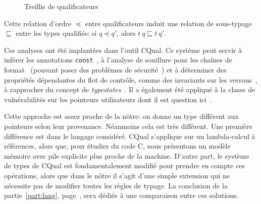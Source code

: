 \begin{figure}[h]
\centering
{}

\caption{Treillis de qualificateurs}
\label{fig:cqual-treillis}
\end{figure}

Cette relation d'ordre $\preceq$ entre qualificateurs induit une relation de
sous-typage $\sqsubseteq$ entre les types qualifiés: si $q \preceq q'$, alors
$t~q \sqsubseteq t~q'$.

Ces analyses ont été implantées dans l'outil CQual. Ce système peut servir à
inférer les annotations \texttt{const}~\cite{pldi99}, à l'analyse de souillure
pour les chaînes de format~\cite{usenix01} (pouvant poser des problèmes de
sécurité~\cite{format-string-attacks}) et à déterminer des propriétés
dépendantes du flot de contrôle, comme des invariants sur les
verrous~\cite{pldi02}, à rapprocher du concept de
\emph{typestates}~\cite{tse12-typestate}. Il a également été appliqué à la
classe de vulnérabilités sur les pointeurs utilisateurs dont il est question
ici~\cite{cquk-usenix04}.

Cette approche est assez proche de la nôtre: on donne un type différent aux
pointeurs selon leur provenance. Néanmoins cela est très différent. Une première
différence est dans le langage considéré. CQual s'applique sur un lambda-calcul
à références, alors que, pour étudier du code C, nous présentons un modèle
mémoire avec pile explicite plus proche de la machine. D'autre part, le système
de types de CQual est fondamentalement modifié pour prendre en compte ces
opérations, alors que dans le nôtre il s'agit d'une simple extension qui ne
nécessite pas de modifier toutes les règles de typage. La conclusion de la
partie~\ref{part:lang}, page~\pageref{cha:ccl2}, sera dédiée à une comparaison
entre ces solutions.

